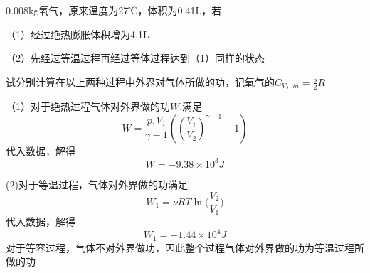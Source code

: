 \documentclass[lang=cn,10pt]{elegantbook}
\begin{document}
	\begin{example}
		0.008kg氧气，原来温度为27℃，体积为0.41L，若
		
		（1）经过绝热膨胀体积增为4.1L
		
		（2）先经过等温过程再经过等体过程达到（1）同样的状态
		
		试分别计算在以上两种过程中外界对气体所做的功，记氧气的$C_{V，m}=\frac{5}{2}R$
	\end{example}
	\begin{solution}
		（1）对于绝热过程气体对外界做的功$W$,满足
		\begin{equation*}
			W=\frac{p_1V_1}{\gamma -1}((\frac{V_1}{V_2})^{\gamma -1}-1)
		\end{equation*}
		代入数据，解得
		\begin{equation*}
			W=-9.38\times10^{3}J
		\end{equation*}
		
		(2)对于等温过程，气体对外界做的功满足
		\begin{equation*}
			W_{1}=\nu RT\ln\mathrm{(}\frac{V_2}{V_1})
		\end{equation*}
		代入数据，解得
		\begin{equation*}
				W_{1}=-1.44\times10^{4}J
		\end{equation*}
		对于等容过程，气体不对外界做功，因此整个过程气体对外界做的功为等温过程所做的功
	\end{solution}
	
\end{document}
